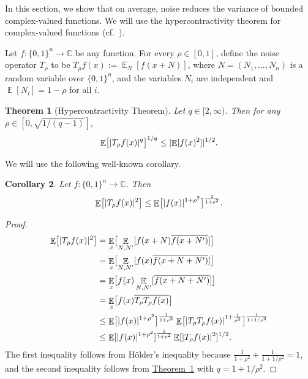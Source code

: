 \documentclass[11pt]{article}
\numberwithin{equation}{section}
\newtheorem{theorem}{Theorem}[section]
\newtheorem{corollary}[theorem]{Corollary}
\theoremstyle{definition}
\theoremstyle{plain}
\newcommand{\C}{\mathbb C}
\newcommand{\expref}[2]{\hyperref[#2]{#1~\ref{#2}}}
\newcommand{\zo}{\{0,1\}}
\DeclarePairedDelimiter{\abs}{\lvert}{\rvert}
\DeclareMathOperator*{\E}{\mathbb{E}}                 %
\begin{document}
  In this section, we show that on average, noise reduces the variance of bounded complex-valued functions.  
  We will use the hypercontractivity theorem for complex-valued functions (cf.~\cite[Theorem~6.1.8]{Hatami-lecturenotes}).

  Let $f\colon \zo^n \to \C$ be any function.
  For every $\rho \in [0, 1]$, define the noise operator $T_{\rho}$ to be $T_\rho f(x) := \E_N[f(x + N)]$, where $N = (N_1, \ldots, N_n)$ is a random variable over $\zo^n$, and the variables $N_i$ are independent and $\E[N_i]=1-\rho$ for all $i$.
  \begin{theorem}[Hypercontractivity Theorem] \label{thm-HC}
    Let $q \in [2, \infty)$.
    Then for any $\rho \in [0, \sqrt{ 1 / (q-1) }]$, 
    \[
      \E \bigl[ \abs{ T_{\rho}f(x) }^q \bigr]^{1/q}
      \le \abs{\E[f(x)^2]}^{1/2} .
    \]
  \end{theorem}
  We will use the following well-known corollary.
  \begin{corollary} \label{cor-HC}
    Let $f\colon \zo^n \to \C$.  Then
    \[
      \E \bigl[ \abs{T_\rho f(x)}^2 \bigr]
      \le \E \bigl[ \abs{f(x)}^{1 + \rho^2} \bigr]^{\frac{2}{1 + \rho^2}}.
    \]
  \end{corollary}
  \begin{proof}
    \begin{align*}
      \E \bigl[ \abs{ T_\rho f(x) }^2 \bigr]
      &= \E_x \bigl[ \E_{N, N'}[f(x + N) \overline{f(x + N')} ] \bigr] \\
      &= \E_x \bigl[ \E_{N, N'}[f(x) \overline{f(x + N + N')} ] \bigr] \\
      &= \E_x \bigl[ f(x) \E_{N, N'}[\overline{f(x + N + N')} ] \bigr] \\
      &= \E_x \bigl[ f(x) \overline{T_{\rho} T_{\rho} f(x)} \bigr] \\
      &\le \E \bigl[ \abs{f(x)}^{1 + \rho^2} \bigr]^{\frac{1}{1 + \rho^2}} \E \bigl[ \abs{ T_\rho T_\rho f(x) }^{1 + \frac{1}{\rho^2}} \bigr]^{\frac{1}{1 + 1/\rho^2}} \\
      &\le \E[ \abs{f(x)}^{1 + \rho^2} ]^{\frac{1}{1 + \rho^2}} \E[ \abs{ T_{\rho}f(x) }^2 ]^{1/2} .
    \end{align*}
    The first inequality follows from H{\"o}lder's inequality because $\frac{1}{1 + \rho^2} + \frac{1}{1 + 1/\rho^2} = 1$, and the second inequality follows from \expref{Theorem}{thm-HC} with $q = 1 + 1/\rho^2$.
  \end{proof}
\end{document}
